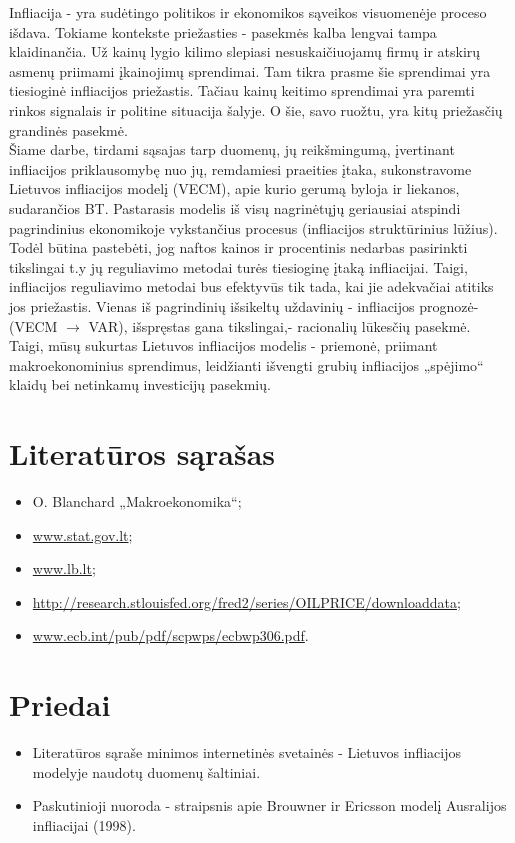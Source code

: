 \documentclass[a4paper]{article}
\begin{document}
Infliacija - yra sudėtingo politikos ir ekonomikos sąveikos visuomenėje proceso išdava. Tokiame kontekste priežasties - pasekmės kalba lengvai tampa klaidinančia. Už kainų lygio kilimo slepiasi nesuskaičiuojamų firmų ir atskirų asmenų priimami įkainojimų sprendimai. Tam tikra prasme šie sprendimai yra tiesioginė infliacijos priežastis. Tačiau kainų keitimo sprendimai yra paremti rinkos signalais ir politine situacija šalyje. O šie, savo ruožtu, yra kitų priežasčių grandinės pasekmė.\\
Šiame darbe, tirdami sąsajas tarp duomenų, jų reikšmingumą, įvertinant infliacijos priklausomybę nuo jų, remdamiesi praeities įtaka, sukonstravome Lietuvos infliacijos modelį (VECM), apie kurio gerumą byloja ir liekanos, sudarančios BT. Pastarasis modelis iš visų nagrinėtųjų geriausiai atspindi pagrindinius ekonomikoje vykstančius procesus (infliacijos struktūrinius lūžius).  Todėl būtina pastebėti, jog naftos kainos ir procentinis nedarbas pasirinkti tikslingai t.y jų reguliavimo metodai turės tiesioginę įtaką infliacijai. Taigi, infliacijos reguliavimo metodai bus efektyvūs tik tada, kai jie adekvačiai atitiks jos priežastis. Vienas iš pagrindinių išsikeltų uždavinių - infliacijos prognozė- (VECM $\longrightarrow$ VAR), išspręstas gana tikslingai,- racionalių lūkesčių pasekmė.\\ 
Taigi, mūsų sukurtas Lietuvos infliacijos modelis -  priemonė, priimant makroekonominius sprendimus, leidžianti išvengti grubių infliacijos „spėjimo“ klaidų bei netinkamų investicijų pasekmių. 

\newpage
\section{Literatūros sąrašas}

\begin{itemize}
\item O. Blanchard  „Makroekonomika“;
\item \url{www.stat.gov.lt}; 
\item \url{www.lb.lt};
\item \url{http://research.stlouisfed.org/fred2/series/OILPRICE/downloaddata};
\item \url{www.ecb.int/pub/pdf/scpwps/ecbwp306.pdf}.
\end{itemize}

\newpage
\section{Priedai}
\begin{itemize}
\item{Literatūros sąraše minimos internetinės svetainės - Lietuvos infliacijos modelyje naudotų duomenų šaltiniai.}\\
\item{Paskutinioji nuoroda - straipsnis apie Brouwner ir Ericsson modelį Ausralijos infliacijai (1998).}
\end{itemize}
\end{document}
